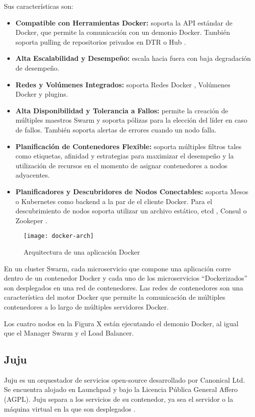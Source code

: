 Sus características son:
\begin{itemize}
\item \textbf{Compatible con Herramientas Docker: } soporta la API estándar de Docker, que permite la comunicación con un demonio Docker. También soporta pulling de repositorios privados en DTR  \cite{Docker2016-is} o Hub \cite{Docker2016-ev}.
\item \textbf{Alta Escalabilidad y Desempeño: }escala hacia fuera con baja degradación de desempeño. 
\item \textbf{Redes y Volúmenes Integrados: }soporta Redes Docker \cite{Docker2016-dm}, Volúmenes Docker \cite{Docker2016-mi} y plugins.
\item \textbf{Alta Disponibilidad y Tolerancia a Fallos: }permite la creación de múltiples maestros Swarm y soporta pólizas para la elección del líder en caso de fallos. También soporta alertas de errores cuando un nodo falla.
\item \textbf{Planificación de Contenedores Flexible: }soporta múltiples filtros tales como etiquetas, afinidad y estrategias para maximizar el desempeño y la utilización de recursos en el momento de asignar contenedores a nodos adyacentes.
\item \textbf{Planificadores y Descubridores de Nodos Conectables: }soporta Mesos o Kubernetes como backend a la par de el cliente Docker. Para el descubrimiento de nodos soporta utilizar un archivo estático, etcd \cite{Coreos2016-ep}, Consul \cite{HashiCorp2016-ei} o Zookeper \cite{Apache2016-oo}.

\end{itemize}

\begin{figure}[H]
    \centering
    \texttt{[image: docker-arch]}
    \caption{ Arquitectura de una aplicación Docker \protect\cite{Docker2016-pk}}
    \label{fig:docker-arch}
\end{figure}
En un cluster Swarm, cada microservicio que compone una aplicación corre dentro de un contenedor Docker y cada uno de los microservicios “Dockerizados” son desplegados en una red de contenedores. Las redes de contenedores son una característica del motor Docker que permite la comunicación de múltiples contenedores a lo largo de múltiples servidores Docker. 

Los cuatro nodos en la Figura X están ejecutando el demonio Docker, al igual que el Manager Swarm y el Load Balancer.


\subsection{Juju}
Juju es un orquestador de servicios open-source desarrollado por Canonical Ltd. Se encuentra alojado en Launchpad y bajo la Licencia Pública General Affero (AGPL). Juju separa a los servicios de su contenedor, ya sea el servidor o la máquina virtual en la que son desplegados \cite{Canonical2016-qx}. 

